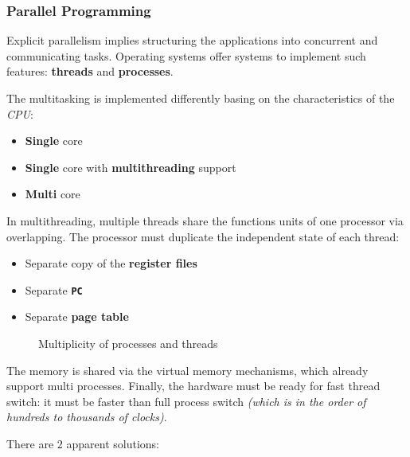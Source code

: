 \documentclass[english]{article}
\begin{document}
\subsubsection{Parallel Programming}

Explicit parallelism implies structuring the applications into concurrent and communicating tasks.
Operating systems offer systems to implement such features: \textbf{threads} and \textbf{processes}.

The multitasking is implemented differently basing on the characteristics of the \textit{CPU}:

\begin{itemize}
  \item \textbf{Single} core
  \item \textbf{Single} core with \textbf{multithreading} support
  \item \textbf{Multi} core
\end{itemize}

In multithreading, multiple threads share the functions units of one processor via overlapping.
The processor must duplicate the independent state of each thread:

\begin{itemize}
  \item Separate copy of the \textbf{register files}
  \item Separate \textbf{\texttt{PC}}
  \item Separate\textbf{ page table}
\end{itemize}

\begin{figure}[htbp]
  \bigskip
  \centering
  \caption{Multiplicity of processes and threads}
  \label{fig:multiplicity-of-processes-and-threads}
  \bigskip
\end{figure}

The memory is shared via the virtual memory mechanisms, which already support multi processes.
Finally, the hardware must be ready for fast thread switch: it must be faster than full process switch \textit{(which is in the order of hundreds to thousands of clocks)}.

There are \(2\) apparent solutions:
\end{document}
